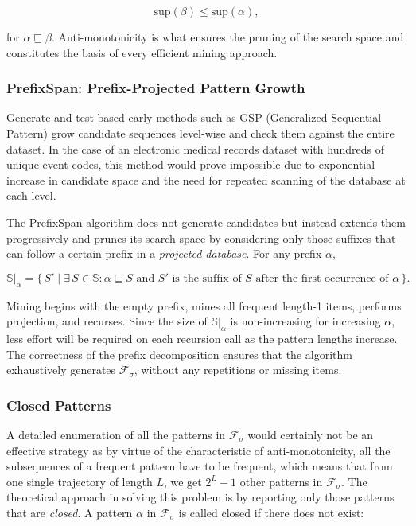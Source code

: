 \begin{equation}
    \mathrm{sup}(\beta) \leq \mathrm{sup}(\alpha),
    \label{eq:antimonotone}
\end{equation}

for $\alpha \sqsubseteq \beta$. Anti-monotonicity is what ensures the pruning of the search space and constitutes the basis of every efficient mining approach.

\subsubsection*{PrefixSpan: Prefix-Projected Pattern Growth}

Generate and test based early methods such as GSP (Generalized Sequential Pattern) grow candidate sequences level-wise and check them against the entire dataset. In the case of an electronic medical records dataset with hundreds of unique event codes, this method would prove impossible due to exponential increase in candidate space and the need for repeated scanning of the database at each level.

The PrefixSpan algorithm \cite{pei2001} does not generate candidates but instead extends them progressively and prunes its search space by considering only those suffixes that can follow a certain prefix in a \emph{projected database}. For any prefix $\alpha$,

\begin{equation}
    \mathbb{S}|_\alpha = \bigl\{\, S' \mid \exists\, S \in \mathbb{S}: \alpha \sqsubseteq S \text{ and } S' \text{ is the suffix of } S \text{ after the first occurrence of } \alpha \,\bigr\}.
    \label{eq:projection}
\end{equation}

Mining begins with the empty prefix, mines all frequent length-1 items, performs projection, and recurses. Since the size of $\mathbb{S}|_\alpha$ is non-increasing for increasing $\alpha$, less effort will be required on each recursion call as the pattern lengths increase. The correctness of the prefix decomposition ensures that the algorithm exhaustively generates $\mathcal{F}_\sigma$, without any repetitions or missing items.

\subsubsection*{Closed Patterns}

A detailed enumeration of all the patterns in $\mathcal{F}_\sigma$ would certainly not be an effective strategy as by virtue of the characteristic of anti-monotonicity, all the subsequences of a frequent pattern have to be frequent, which means that from one single trajectory of length $L$, we get $2^L-1$ other patterns in $\mathcal{F}_\sigma$. The theoretical approach in solving this problem is by reporting only those patterns that are \emph{closed}. A pattern $\alpha$ in $\mathcal{F}_\sigma$ is called closed if there does not exist:

